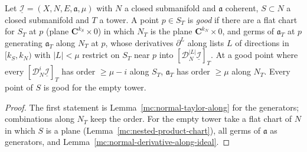 \begin{lemma}
\label{mc:normal-coefficient-invariant-along}
\leanok
Let \(\underline{\mathcal I}=(X,N,E,\mathfrak a,\mu)\) with \(N\) a closed submanifold and \(\mathfrak a\) coherent, \(S\subset N\) a closed submanifold and \(T\) a tower. A point
\(p\in S_T\) is \emph{good} if there are a flat chart for \(S_T\) at \(p\) (plane \(\mathbf C^{k_S}\times0\)) in which \(N_T\) is the plane \(\mathbf C^{k_N}\times0\), and germs of
\(\mathfrak a_T\) at \(p\) generating \(\mathfrak a_T\) along \(N_T\) at \(p\), whose derivatives \(\partial^L\) along lists \(L\) of directions in \([k_S,k_N)\) with \(|L|<\mu\) restrict
on \(S_T\) near \(p\) into \([\mathcal D_N^{|L|}\underline{\mathcal I}]_T\). At a good point where every \([\mathcal D_N^i\underline{\mathcal I}]_T\) has order \(\ge\mu-i\) along \(S_T\),
\(\mathfrak a_T\) has order \(\ge\mu\) along \(N_T\). Every point of \(S\) is good for the empty tower.
\end{lemma}
\begin{proof}
\leanok
The first statement is Lemma~\ref{mc:normal-taylor-along} for the generators; combinations along \(N_T\) keep the order. For the empty tower take a flat chart of \(N\)
in which \(S\) is a plane (Lemma~\ref{mc:nested-product-chart}), all germs of \(\mathfrak a\) as generators, and Lemma~\ref{mc:normal-derivative-along-ideal}.
\end{proof}

